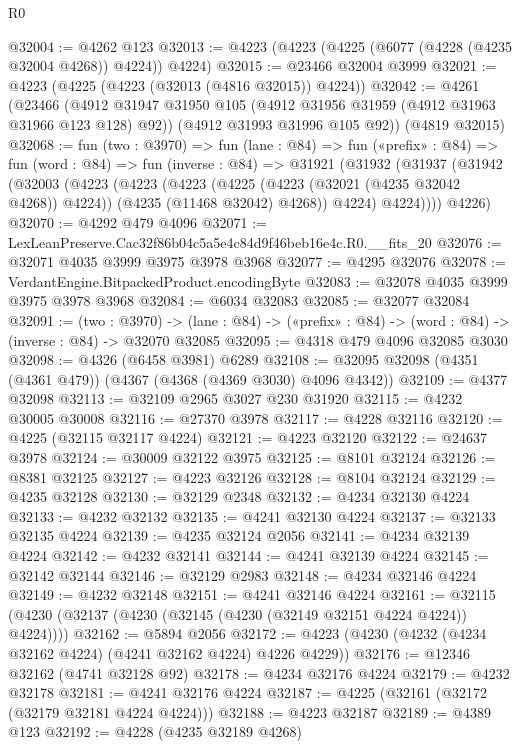 \begin{lexlean}{R0}
\begin{coremodule}
@32004 := @4262 @123
@32013 := @4223 (@4223 (@4225 (@6077 (@4228 (@4235 @32004 @4268)) @4224)) @4224)
@32015 := @23466 @32004 @3999
@32021 := @4223 (@4225 (@4223 (@32013 (@4816 @32015)) @4224))
@32042 := @4261
    (@23466
      (@4912 @31947 @31950 @105 (@4912 @31956 @31959 (@4912 @31963 @31966 @123 @128) @92))
      (@4912 @31993 @31996 @105 @92))
    (@4819 @32015)
@32068 := fun (two : @3970) =>
  fun (lane : @84) =>
  fun («prefix» : @84) =>
  fun (word : @84) =>
  fun (inverse : @84) =>
  @31921
    (@31932
      (@31937
        (@31942
          (@32003
            (@4223
              (@4223
                (@4223
                  (@4225 (@4223 (@32021 (@4235 @32042 @4268)) @4224))
                  (@4235 (@11468 @32042) @4268))
                @4224)
              @4224))))
      @4226)
@32070 := @4292 @479 @4096
@32071 := LexLeanPreserve.Cac32f86b04c5a5e4c84d9f46beb16e4c.R0.__fits_20
@32076 := @32071 @4035 @3999 @3975 @3978 @3968
@32077 := @4295 @32076
@32078 := VerdantEngine.BitpackedProduct.encodingByte
@32083 := @32078 @4035 @3999 @3975 @3978 @3968
@32084 := @6034 @32083
@32085 := @32077 @32084
@32091 := (two : @3970) ->
  (lane : @84) -> («prefix» : @84) -> (word : @84) -> (inverse : @84) -> @32070 @32085
@32095 := @4318 @479 @4096 @32085 @3030
@32098 := @4326 (@6458 @3981) @6289
@32108 := @32095 @32098 (@4351 (@4361 @479)) (@4367 (@4368 (@4369 @3030) @4096 @4342))
@32109 := @4377 @32098
@32113 := @32109 @2965 @3027 @230 @31920
@32115 := @4232 @30005 @30008
@32116 := @27370 @3978
@32117 := @4228 @32116
@32120 := @4225 (@32115 @32117 @4224)
@32121 := @4223 @32120
@32122 := @24637 @3978
@32124 := @30009 @32122 @3975
@32125 := @8101 @32124
@32126 := @8381 @32125
@32127 := @4223 @32126
@32128 := @8104 @32124
@32129 := @4235 @32128
@32130 := @32129 @2348
@32132 := @4234 @32130 @4224
@32133 := @4232 @32132
@32135 := @4241 @32130 @4224
@32137 := @32133 @32135 @4224
@32139 := @4235 @32124 @2056
@32141 := @4234 @32139 @4224
@32142 := @4232 @32141
@32144 := @4241 @32139 @4224
@32145 := @32142 @32144
@32146 := @32129 @2983
@32148 := @4234 @32146 @4224
@32149 := @4232 @32148
@32151 := @4241 @32146 @4224
@32161 := @32115 (@4230 (@32137 (@4230 (@32145 (@4230 (@32149 @32151 @4224 @4224)) @4224))))
@32162 := @5894 @2056
@32172 := @4223 (@4230 (@4232 (@4234 @32162 @4224) (@4241 @32162 @4224) @4226 @4229))
@32176 := @12346 @32162 (@4741 @32128 @92)
@32178 := @4234 @32176 @4224
@32179 := @4232 @32178
@32181 := @4241 @32176 @4224
@32187 := @4225 (@32161 (@32172 (@32179 @32181 @4224 @4224)))
@32188 := @4223 @32187
@32189 := @4389 @123
@32192 := @4228 (@4235 @32189 @4268)

\end{coremodule}
\end{lexlean}
